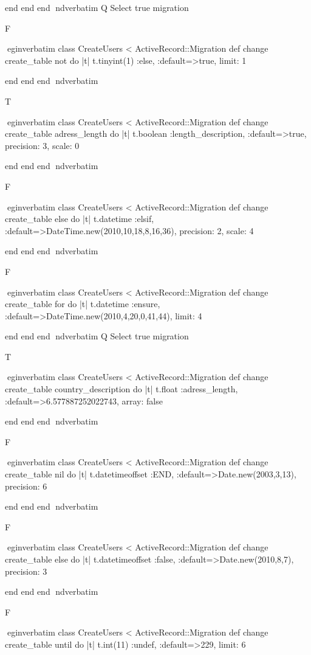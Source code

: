     end 
  end 
end
nd{verbatim}
Q
 Select true migration

F

egin{verbatim}
 class CreateUsers < ActiveRecord::Migration 
  def change 
    create_table not do |t| 
      t.tinyint(1) :else, :default=>true, limit: 1
    
    end 
  end 
end
nd{verbatim}

T

egin{verbatim}
 class CreateUsers < ActiveRecord::Migration 
  def change 
    create_table adress_length do |t| 
      t.boolean :length_description, :default=>true, precision: 3, scale: 0
    
    end 
  end 
end
nd{verbatim}

F

egin{verbatim}
 class CreateUsers < ActiveRecord::Migration 
  def change 
    create_table else do |t| 
      t.datetime :elsif, :default=>DateTime.new(2010,10,18,8,16,36), precision: 2, scale: 4
    
    end 
  end 
end
nd{verbatim}

F

egin{verbatim}
 class CreateUsers < ActiveRecord::Migration 
  def change 
    create_table for do |t| 
      t.datetime :ensure, :default=>DateTime.new(2010,4,20,0,41,44), limit: 4
    
    end 
  end 
end
nd{verbatim}
Q
 Select true migration

T

egin{verbatim}
 class CreateUsers < ActiveRecord::Migration 
  def change 
    create_table country_description do |t| 
      t.float :adress_length, :default=>6.577887252022743, array: false
    
    end 
  end 
end
nd{verbatim}

F

egin{verbatim}
 class CreateUsers < ActiveRecord::Migration 
  def change 
    create_table nil do |t| 
      t.datetimeoffset :END, :default=>Date.new(2003,3,13), precision: 6
    
    end 
  end 
end
nd{verbatim}

F

egin{verbatim}
 class CreateUsers < ActiveRecord::Migration 
  def change 
    create_table else do |t| 
      t.datetimeoffset :false, :default=>Date.new(2010,8,7), precision: 3
    
    end 
  end 
end
nd{verbatim}

F

egin{verbatim}
 class CreateUsers < ActiveRecord::Migration 
  def change 
    create_table until do |t| 
      t.int(11) :undef, :default=>229, limit: 6
    
